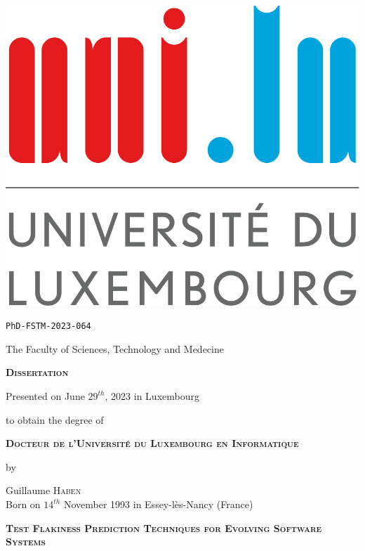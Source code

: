 \thispagestyle{empty}

\begin{center}         
         \includegraphics[width=0.2\linewidth]{figures/logo/logoul.pdf}
         \vspace{0.3cm}\noindent
        
        \texttt{PhD-FSTM-2023-064}
        
         The Faculty of Sciences, Technology and Medecine
         
         \vspace{1cm}\noindent
         {\LARGE \textbf{\textsc{Dissertation}}}
         
         \vspace{0.5cm}
         \noindent
         Presented on June $29^{th}$, 2023 in Luxembourg
         
         \vspace{0.5cm}\noindent
         to obtain the degree of
         
         \vspace{0.8cm}\noindent
         {\large \textbf{\textsc{Docteur de l'Université du Luxembourg en Informatique}}}

         \vspace{0.5cm}\noindent
         {\Large by}

         \vspace{0.5cm}\noindent
         {\Large Guillaume \textsc{Haben}}\\
         {\footnotesize Born on $14^{th}$ November 1993 in Essey-lès-Nancy (France)}

        \begin{spacing}{1.7}
         \vspace{1cm}\noindent
         {\LARGE \textbf{\textsc{Test Flakiness Prediction Techniques for Evolving Software Systems}}}\\[0.4cm] 
        \end{spacing}
\end{center}

\vspace{2cm}

